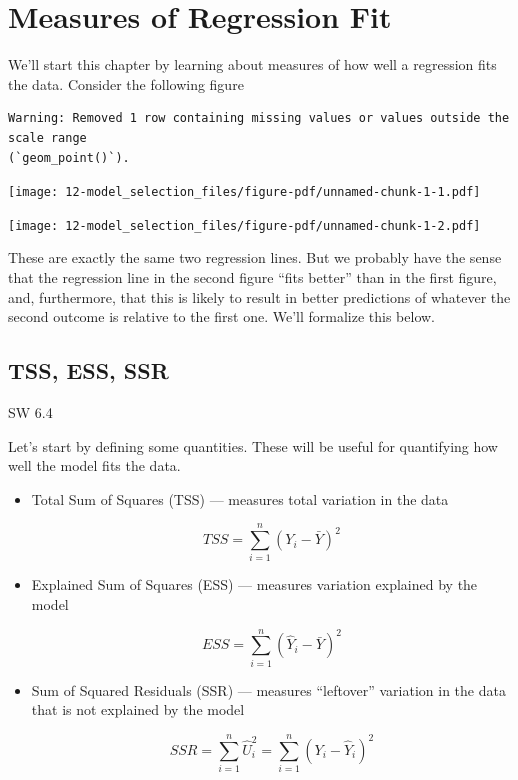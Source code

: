 \documentclass[
  letterpaper,
  DIV=11,
  numbers=noendperiod]{scrreprt}
\begin{document}
\section{Measures of Regression Fit}\label{measures-of-regression-fit}

We'll start this chapter by learning about measures of how well a
regression fits the data. Consider the following figure

\begin{verbatim}
Warning: Removed 1 row containing missing values or values outside the scale range
(`geom_point()`).
\end{verbatim}

\begin{center}
\texttt{[image: 12-model\_selection\_files/figure-pdf/unnamed-chunk-1-1.pdf]}
\end{center}

\begin{center}
\texttt{[image: 12-model\_selection\_files/figure-pdf/unnamed-chunk-1-2.pdf]}
\end{center}

These are exactly the same two regression lines. But we probably have
the sense that the regression line in the second figure ``fits better''
than in the first figure, and, furthermore, that this is likely to
result in better predictions of whatever the second outcome is relative
to the first one. We'll formalize this below.

\subsection{TSS, ESS, SSR}\label{tss-ess-ssr}

SW 6.4

Let's start by defining some quantities. These will be useful for
quantifying how well the model fits the data.

\begin{itemize}
\item
  Total Sum of Squares (TSS) --- measures total variation in the data

  \[
      TSS = \sum_{i=1}^n (Y_i - \bar{Y})^2
    \]
\item
  Explained Sum of Squares (ESS) --- measures variation explained by the
  model

  \[
      ESS = \sum_{i=1}^n (\hat{Y}_i - \bar{Y})^2
    \]
\item
  Sum of Squared Residuals (SSR) --- measures ``leftover'' variation in
  the data that is not explained by the model

  \[
      SSR = \sum_{i=1}^n \hat{U}_i^2 = \sum_{i=1}^n (Y_i - \hat{Y}_i)^2
    \]
\end{itemize}
\end{document}
